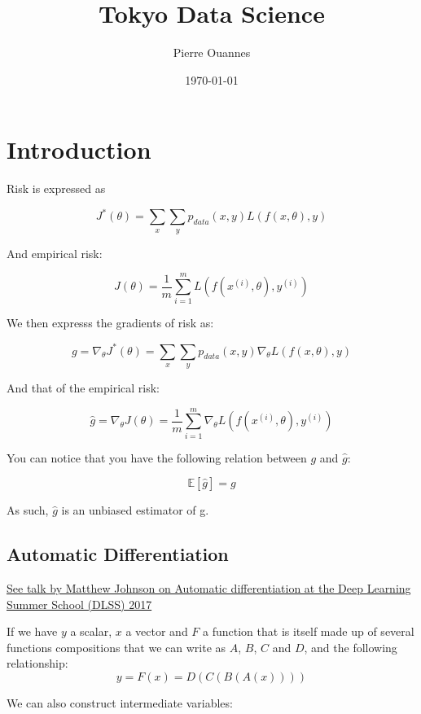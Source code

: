 \documentclass{article}
\theoremstyle{problemstyle}
\begin{document}
\title{Tokyo Data Science}
\date{{\today}}
\author{Pierre Ouannes}

\maketitle

\tableofcontents


\section{ Introduction}


Risk is expressed as 

\[
  J^*(\theta) = \sum\limits_{x} \sum\limits_{y} p_{data} (x,y) L \left( f(x, \theta), y \right)  
\]

And empirical risk:

\[
  J(\theta) = \frac{1}{m} \sum\limits_{i=1}^{m} L \left( f( x^{(i)}, \theta), y^{(i)} \right)
\]

We then expresss the gradients of risk as:

\[
  g = \nabla_{\theta} J^* ( \theta) = \sum\limits_{x} \sum\limits_{y} p_{data} (x,y) \nabla_{\theta} L \left( f(x, \theta), y \right)
\]

And that of the empirical risk:

\[
  \hat{g} = \nabla_\theta J(\theta) = \frac{1}{m} \sum\limits_{i=1}^{m} \nabla_\theta L\left( f(x^{(i)}, \theta), y^{(i)} \right)
\]

You can notice that you have the following relation between $g$ and $\hat{g}$:

\[
  \mathbb{E} [\hat{g}] = g
\]

As such, $\hat{g}$ is an unbiased estimator of g. 

\subsection{Automatic Differentiation}

\href{http://videolectures.net/deeplearning2017_johnson_automatic_differentiation}{See talk by Matthew Johnson on Automatic differentiation at the Deep Learning Summer School (DLSS) 2017}

If we have $y$ a scalar, $x$ a vector and $F$ a function that is itself made up of several functions compositions that we can write as $A$, $B$, $C$ and $D$, and the following relationship:
\[
  y = F(x) = D(C(B(A(x))))
\]

We can also construct intermediate variables:
\end{document}
